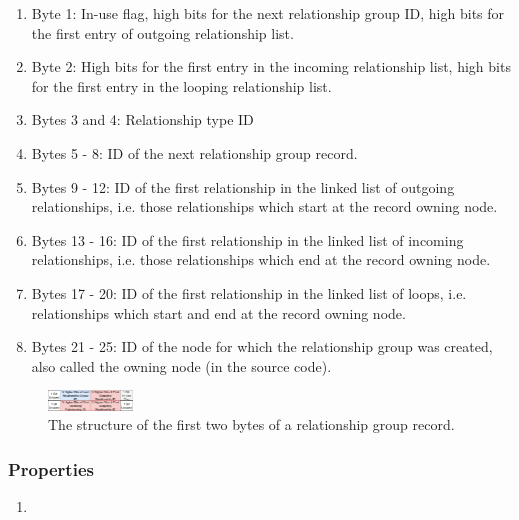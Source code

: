 \documentclass[a4paper,10pt]{article}
\begin{document}
    \begin{enumerate}
     \item Byte 1: In-use flag, high bits for the next relationship group ID, high bits for the first entry of outgoing relationship list.
     \item Byte 2: High bits for the first entry in the incoming relationship list, high bits for the first entry in the looping relationship list.
     \item Bytes 3 and 4: Relationship type ID
     \item Bytes 5 - 8: ID of the next relationship group record.
     \item Bytes 9 - 12: ID of the first relationship in the linked list of outgoing relationships, i.e. those relationships which start at the record owning node.
     \item Bytes 13 - 16: ID of the first relationship in the linked list of incoming relationships, i.e. those relationships which end at the record owning node.
     \item Bytes 17 - 20: ID of the first relationship in the linked list of loops, i.e. relationships which start and end at the record owning node.
     \item Bytes 21 - 25: ID of the node for which the relationship group was created, also called the owning node (in the source code).
    \end{enumerate}
    
    \begin{figure}[H]\label{rel_group_first_bytes}
        \begin{center}
            \includegraphics[keepaspectratio,height=0.2\textheight,width=0.2\textwidth]{img/relationship/relationship_group_first_bytes.png}
        \end{center}
        \caption{The structure of the first two bytes of a relationship group record.} %
    \end{figure}
    

    \subsubsection{Properties}
    \begin{enumerate}
     \item 
    \end{enumerate}
    
\end{document}
